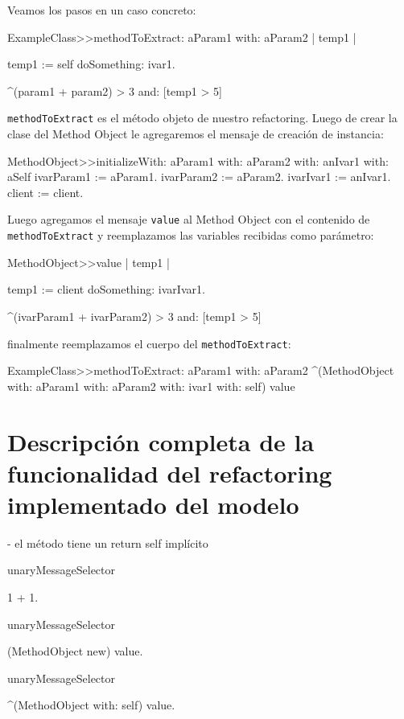 Veamos los pasos en un caso concreto:

\begin{code}
ExampleClass>>methodToExtract: aParam1 with: aParam2
    | temp1 |

    temp1 := self doSomething: ivar1.

    ^(param1 + param2) > 3 and: [temp1 > 5]
\end{code}

\lstinline{methodToExtract} es el método objeto de nuestro refactoring. Luego de crear la clase del
Method Object le agregaremos el mensaje de creación de instancia:

\begin{code}
MethodObject>>initializeWith: aParam1 with: aParam2 with: anIvar1 with: aSelf
    ivarParam1 := aParam1.
    ivarParam2 := aParam2.
    ivarIvar1 := anIvar1.
    client := client.
\end{code}

Luego agregamos el mensaje \lstinline{value} al Method Object con el contenido de
\lstinline{methodToExtract} y reemplazamos las variables recibidas como parámetro:

\begin{code}
MethodObject>>value
    | temp1 |

    temp1 := client doSomething: ivarIvar1.

    ^(ivarParam1 + ivarParam2) > 3 and: [temp1 > 5]
\end{code}

finalmente reemplazamos el cuerpo del \lstinline{methodToExtract}:

\begin{code}
ExampleClass>>methodToExtract: aParam1 with: aParam2
    ^(MethodObject with: aParam1 with: aParam2 with: ivar1 with: self) value
\end{code}



\section{Descripción completa de la funcionalidad del refactoring implementado del modelo}
- el método tiene un return self implícito

\begin{code}

unaryMessageSelector

 1 + 1.

unaryMessageSelector
 
 (MethodObject new) value.

unaryMessageSelector

 ^(MethodObject with: self) value.

\end{code}


